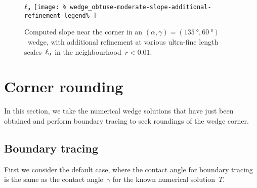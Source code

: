 \begin{figure}
  \newcommand*{\subfigurewidth}{0.45\textwidth}
  \centering
  $\ell_{\mathrm{u}}$
  \texttt{[image: \%
    wedge\_obtuse-moderate-slope-additional-refinement-legend\%
  ]}
  \hspace*{\fill}
  \begin{subfigure}[t]{\subfigurewidth}
  \end{subfigure}
    \hfill
  \begin{subfigure}[t]{\subfigurewidth}
  \end{subfigure}
  \hspace*{\fill}
  \caption{
    Computed slope near the corner
    in an $(\alpha, \gamma) = (\SI{135}{\degree}, \SI{60}{\degree})$~wedge,
    with additional refinement
    at various ultra-fine length scales~$\ell_{\mathrm{u}}$
    in the neighbourhood~$r < 0.01$.
  }
  \label{fig:wedge_obtuse-moderate-slope-additional-refinement}
\end{figure}

\section{Corner rounding}
\label{sec:re-entrant.rounding}

In this section,
we take the numerical wedge solutions that have just been obtained
and perform boundary tracing
to seek roundings of the wedge corner.

\subsection{Boundary tracing}
\label{sec:re-entrant.rounding.tracing}

First we consider the default case,
where the contact angle for boundary tracing
is the same as the contact angle~$\gamma$
for the known numerical solution~$T$.

